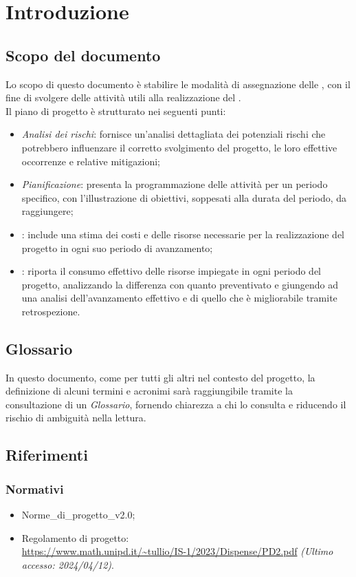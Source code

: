 \chapter{Introduzione}\label{chap:intro}

\section{Scopo del documento}
Lo scopo di questo documento è stabilire le modalità di assegnazione delle , con il fine di svolgere delle attività utili alla realizzazione del .\\Il piano di progetto è strutturato nei seguenti punti:
\begin{itemize}
    \item \textit{Analisi dei rischi}: fornisce un'analisi dettagliata dei potenziali rischi che potrebbero influenzare il corretto svolgimento del progetto, le loro effettive occorrenze e relative mitigazioni;
    \item \textit{Pianificazione}: presenta la programmazione delle attività per un periodo specifico, con l'illustrazione di obiettivi, soppesati alla durata del periodo, da raggiungere;
    \item \textit{}: include una stima dei costi e delle risorse necessarie per la realizzazione del progetto in ogni suo periodo di avanzamento;
    \item \textit{}: riporta il consumo effettivo delle risorse impiegate in ogni periodo del progetto, analizzando la differenza con quanto preventivato e giungendo ad una analisi dell'avanzamento effettivo e di quello che è migliorabile tramite retrospezione.
\end{itemize}

\section{Glossario}
In questo documento, come per tutti gli altri nel contesto del progetto, la definizione di alcuni termini e acronimi sarà raggiungibile tramite la consultazione di un \textit{Glossario}, fornendo chiarezza a chi lo consulta e riducendo il rischio di ambiguità nella lettura.
\section{Riferimenti}
    \subsection{Normativi}
        \begin{itemize}
            \item Norme\_di\_progetto\_v2.0;
            \item Regolamento di progetto:\\
                \url{https://www.math.unipd.it/~tullio/IS-1/2023/Dispense/PD2.pdf} \textit{(Ultimo accesso: 2024/04/12)}.
    \end{itemize}
